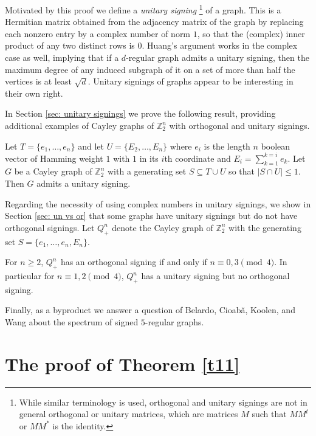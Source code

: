 Motivated by this proof we define a {\em unitary signing}
\footnote{While similar terminology is used, orthogonal and 
unitary signings are not in general orthogonal or unitary matrices, 
which are matrices $M$ such that $MM^t$ or $MM^*$ is the identity.}
of a graph. This is a Hermitian
matrix obtained from the adjacency 
matrix of the graph by replacing each nonzero entry
by a complex number of norm $1$, 
so that the (complex) inner product of any two distinct
rows is $0$.  Huang's argument works in the complex case
as well, implying that if a $d$-regular graph admits a unitary signing,
then the maximum degree of any induced subgraph of it on a set of more
than half the vertices is at least $\sqrt d$. 
Unitary signings of graphs appear to be interesting in their own right. 

In Section \ref{sec: unitary signings} we prove the following result, providing additional 
examples of Cayley graphs of $\mathbb{Z}_{2}^{n}$ with 
orthogonal and unitary signings.

\begin{theo}
\label{t21}
Let $T = \{e_1, \ldots, e_n \}$ and let $U = \{E_2, \ldots, E_n \}$
where $e_i$ is the length $n$ boolean vector of Hamming weight $1$
with $1$ in its
$i$th coordinate and $E_i = \sum_{k=1}^{k = i} e_k$.
Let $G$ be a Cayley graph of ${\mathbb{Z}_{2}^{n}}$ with a generating set $S \subseteq
T \cup U$ so that $|S \cap U| \leq 1$. Then $G$ admits 
a unitary signing.
\end{theo}

Regarding the necessity of using complex numbers in unitary signings, 
we show in Section \ref{sec: un vs or} that some graphs have unitary signings
but do not have orthogonal signings. Let $Q_{+}^n$ denote the Cayley graph
of ${\mathbb{Z}_{2}^{n}}$ with the generating set $S=\{e_1, \ldots ,e_n,E_n\}$. 
\begin{prop}
\label{Pr: No Real Signing}
For $n \geq 2$, $Q_{+}^{n}$ has an orthogonal signing if and only 
if $n \equiv 0,3 \pmod{4}$. In particular 
for $n \equiv 1, 2 \pmod{4}$, $Q_{+}^{n}$ has a unitary 
signing but no orthogonal signing.
\end{prop}

Finally, as a byproduct we answer a question of 
Belardo, Cioab\u{a}, Koolen, and Wang \cite{BCKW} 
about the spectrum of signed $5$-regular
graphs.

\section{The proof of Theorem \ref{t11}}
\vspace{0.2cm}

